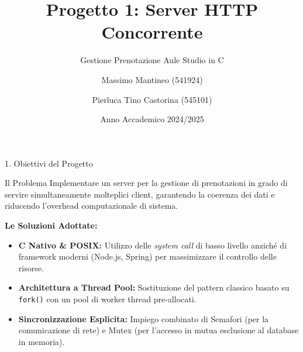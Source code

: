 \documentclass[aspectratio=169, 10pt]{beamer}
\title[Server HTTP Concorrente POSIX]{Progetto 1: Server HTTP Concorrente}
\subtitle{Gestione Prenotazione Aule Studio in C}
\author[Mantineo, Castorina]{Massimo Mantineo (541924) \and Pierluca Tino Castorina (545101)}
\institute[UniMe]{Università degli Studi di Messina \\ Dipartimento MIFT - Laurea in Informatica}
\date{Anno Accademico 2024/2025}
\begin{document}
\begin{frame}
    \titlepage
\end{frame}

\begin{frame}{1. Obiettivi del Progetto}
    \begin{block}{Il Problema}
        Implementare un server per la gestione di prenotazioni in grado di servire simultaneamente molteplici client, garantendo la coerenza dei dati e riducendo l'overhead computazionale di sistema.
    \end{block}
    
    \vspace{0.3cm}
    
    \textbf{Le Soluzioni Adottate:}
    \begin{itemize}
        \item \textbf{C Nativo \& POSIX:} Utilizzo delle \textit{system call} di basso livello anziché di framework moderni (Node.js, Spring) per massimizzare il controllo delle risorse.
        \item \textbf{Architettura a Thread Pool:} Sostituzione del pattern classico basato su \texttt{fork()} con un pool di worker thread pre-allocati.
        \item \textbf{Sincronizzazione Esplicita:} Impiego combinato di Semafori (per la comunicazione di rete) e Mutex (per l'accesso in mutua esclusione al database in memoria).
    \end{itemize}
\end{frame}
\end{document}
